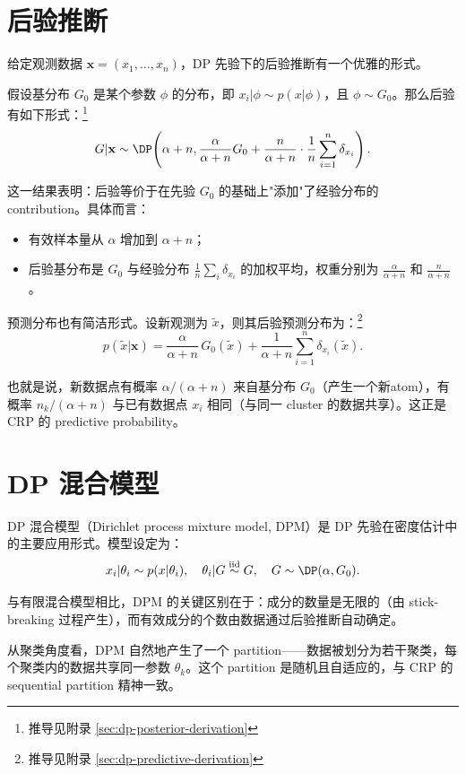 \section{后验推断}

给定观测数据 $\mathbf{x} = (x_1, \ldots, x_n)$，DP 先验下的后验推断有一个优雅的形式。

假设基分布 $G_0$ 是某个参数 $\phi$ 的分布，即 $x_i | \phi \sim p(x | \phi)$，且 $\phi \sim G_0$。那么后验有如下形式：\footnote{推导见附录 \cref{sec:dp-posterior-derivation}}
\[
G | \mathbf{x} \sim \DP\!\left(\alpha + n, \frac{\alpha}{\alpha + n} G_0 + \frac{n}{\alpha + n} \cdot \frac{1}{n}\sum_{i=1}^n \delta_{x_i}\right).
\]

这一结果表明：后验等价于在先验 $G_0$ 的基础上"添加"了经验分布的 contribution。具体而言：
\begin{itemize}
  \item 有效样本量从 $\alpha$ 增加到 $\alpha + n$；
  \item 后验基分布是 $G_0$ 与经验分布 $\frac{1}{n}\sum_i \delta_{x_i}$ 的加权平均，权重分别为 $\frac{\alpha}{\alpha+n}$ 和 $\frac{n}{\alpha+n}$。
\end{itemize}

预测分布也有简洁形式。设新观测为 $\tilde{x}$，则其后验预测分布为：\footnote{推导见附录 \cref{sec:dp-predictive-derivation}}
\[
p(\tilde{x} | \mathbf{x}) = \frac{\alpha}{\alpha + n} \, G_0(\tilde{x}) + \frac{1}{\alpha + n} \sum_{i=1}^n \delta_{x_i}(\tilde{x}).
\]

也就是说，新数据点有概率 $\alpha/(\alpha+n)$ 来自基分布 $G_0$（产生一个新atom），有概率 $n_k/(\alpha+n)$ 与已有数据点 $x_i$ 相同（与同一 cluster 的数据共享）。这正是 CRP 的 predictive probability。

\section{DP 混合模型}

DP 混合模型（Dirichlet process mixture model, DPM）是 DP 先验在密度估计中的主要应用形式。模型设定为：
\[
x_i | \theta_i \sim p(x | \theta_i), \quad \theta_i | G \stackrel{\mathrm{iid}}{\sim} G, \quad G \sim \DP(\alpha, G_0).
\]

与有限混合模型相比，DPM 的关键区别在于：成分的数量是无限的（由 stick-breaking 过程产生），而有效成分的个数由数据通过后验推断自动确定。

从聚类角度看，DPM 自然地产生了一个 partition——数据被划分为若干聚类，每个聚类内的数据共享同一参数 $\theta_k$。这个 partition 是随机且自适应的，与 CRP 的 sequential partition 精神一致。

